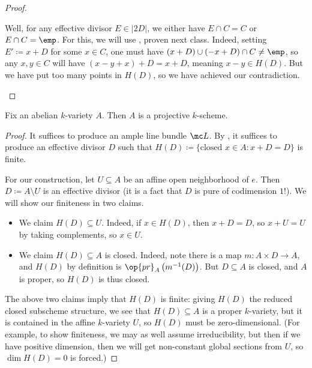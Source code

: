 \documentclass[../notes.tex]{subfiles}
\begin{document}
\begin{proof}
\begin{itemize}
		Well, for any effective divisor $E\in\left|2D\right|$, we either have $E\cap C=C$ or $E\cap C=\emp$. For this, we will use , proven next class. Indeed, setting $E'\coloneqq x+D$ for some $x\in C$, one must have $(x+D)\cup(-x+D)\cap C\ne\emp$, so any $x,y\in C$ will have $(x-y+x)+D=x+D$, meaning $x-y\in H(D)$. But we have put too many points in $H(D)$, so we have achieved our contradiction.
		\qedhere
	\end{itemize}
\end{proof}
\begin{corollary} \label{cor:ab-var-proj}
	Fix an abelian $k$-variety $A$. Then $A$ is a projective $k$-scheme.
\end{corollary}
\begin{proof}
	It suffices to produce an ample line bundle $\mc L$. By , it suffices to produce an effective divisor $D$ such that $H(D)\coloneqq\{\text{closed }x\in A:x+D=D\}$ is finite.
	
	For our construction, let $U\subseteq A$ be an affine open neighborhood of $e$. Then $D\coloneqq A\setminus U$ is an effective divisor (it is a fact that $D$ is pure of codimension $1$!). We will show our finiteness in two claims.
	\begin{itemize}
		\item We claim $H(D)\subseteq U$. Indeed, if $x\in H(D)$, then $x+D=D$, so $x+U=U$ by taking complements, so $x\in U$.
		\item We claim $H(D)\subseteq A$ is closed. Indeed, note there is a map $m\colon A\times D\to A$, and $H(D)$ by definition is $\op{pr}_A\left(m^{-1}(D)\right)$. But $D\subseteq A$ is closed, and $A$ is proper, so $H(D)$ is thus closed.
	\end{itemize}
	The above two claims imply that $H(D)$ is finite: giving $H(D)$ the reduced closed subscheme structure, we see that $H(D)\subseteq A$ is a proper $k$-variety, but it is contained in the affine $k$-variety $U$, so $H(D)$ must be zero-dimensional. (For example, to show finiteness, we may as well assume irreducibility, but then if we have positive dimension, then we will get non-constant global sections from $U$, so $\dim H(D)=0$ is forced.)
\end{proof}
\end{document}
